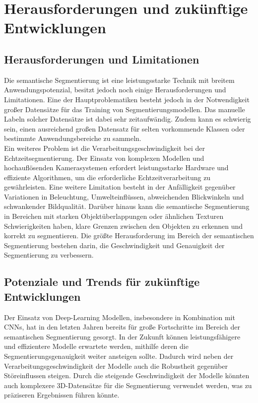 \chapter{Herausforderungen und zukünftige Entwicklungen}
\section{Herausforderungen und Limitationen}
Die semantische Segmentierung ist eine leistungsstarke Technik mit breitem
Anwendungspotenzial, besitzt jedoch noch einige Herausforderungen und
Limitationen. Eine der Hauptproblematiken besteht jedoch in der Notwendigkeit
großer Datensätze für das Training von Segmentierungsmodellen. Das manuelle
Labeln solcher Datensätze ist dabei sehr zeitaufwändig. Zudem kann es schwierig
sein, einen ausreichend großen Datensatz für selten vorkommende Klassen oder
bestimmte Anwendungsbereiche zu sammeln.\cite{hu2021towards} \\Ein weiteres
Problem ist die Verarbeitungsgeschwindigkeit bei der Echtzeitsegmentierung. Der
Einsatz von komplexen Modellen und hochauflösenden Kamerasystemen erfordert
leistungsstarke Hardware und effiziente Algorithmen, um die erforderliche
Echtzeitverarbeitung zu gewährleisten. Eine weitere Limitation besteht in der
Anfälligkeit gegenüber Variationen in Beleuchtung, Umwelteinflüssen,
abweichenden Blickwinkeln und schwankender Bildqualität. Darüber hinaus kann
die semantische Segmentierung in Bereichen mit starken Objektüberlappungen oder
ähnlichen Texturen Schwierigkeiten haben, klare Grenzen zwischen den Objekten
zu erkennen und korrekt zu segmentieren. Die größte Herausforderung im Bereich
der semantischen Segmentierung bestehen darin, die Geschwindigkeit und
Genauigkeit der Segmentierung zu verbessern.\cite{20222324,9420573}

\section{Potenziale und Trends für zukünftige Entwicklungen}

Der Einsatz von Deep-Learning Modellen, insbesondere in Kombination mit CNNs,
hat in den letzten Jahren bereits für große Fortschritte im Bereich der
semantischen Segmentierung gesorgt. In der Zukunft können leistungsfähigere und
effizientere Modelle erwartete werden, mithilfe deren die
Segmentierungsgenauigkeit weiter ansteigen sollte. Dadurch wird neben der
Verarbeitungsgeschwindigkeit der Modelle auch die Robustheit gegenüber
Störeinflussen steigen. Durch die steigende Geschwindigkeit der Modelle
könnten auch komplexere 3D-Datensätze für die Segmentierung verwendet werden,
was zu präziseren Ergebnissen führen könnte.\cite{9420573}

